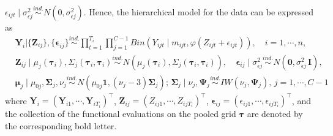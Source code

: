 $\epsilon_{ijt} \mid \sigma^2_{\epsilon j} \stackrel{ind.}{\sim}N(0,\sigma^2_{\epsilon j})$. 
Hence, the hierarchical model for the data can be expressed as 
\begin{equation}
    \begin{split}
        &\mathbf{Y}_i|\{\mathbf{Z}_{ij}\},\{\boldsymbol{\epsilon}_{ij}\}\stackrel{ind.}{\sim} \prod_{t=1}^{T_i}\prod_{j=1}^{C-1}Bin(Y_{ijt}\mid m_{ijt},\varphi(Z_{ijt}+\epsilon_{ijt})),\quad i=1,\cdots,n,\\
        &\mathbf{Z}_{ij}\mid \mu_j(\boldsymbol{\tau}_i),\Sigma_j(\boldsymbol{\tau}_i,\boldsymbol{\tau}_i)\stackrel{ind.}{\sim} N(\mu_j(\boldsymbol{\tau}_i),\Sigma_j(\boldsymbol{\tau}_i,\boldsymbol{\tau}_i)),\quad \boldsymbol{\epsilon}_{ij}\mid \sigma_{\epsilon j}^2\stackrel{ind.}{\sim} 
        N(\mathbf{0},\sigma_{\epsilon j}^2 \, \mathbf{I}),\\
        & \boldsymbol{\mu}_j\mid\mu_{0j},\boldsymbol{\Sigma}_j,\nu_j \stackrel{ind.}{\sim} 
        N(\mu_{0j}\mathbf{1}, (\nu_j - 3) \boldsymbol{\Sigma}_j); \, \boldsymbol{\Sigma}_j\mid\nu_j,\boldsymbol{\Psi}_j\stackrel{ind.}{\sim} 
        IW(\nu_j,\boldsymbol{\Psi}_j), \, j=1,\cdots,C-1
    \end{split}
    \label{eq:fddsmulti}
\end{equation}
where $\mathbf{Y}_{i}=(\mathbf{Y}_{i1},\cdots,\mathbf{Y}_{iT_i})^{\top}$, 
$\mathbf{Z}_{ij}=(Z_{ij1},\cdots,Z_{ijT_i})^{\top}$, 
$\boldsymbol{\epsilon}_{ij}=(\epsilon_{ij1},\cdots,\epsilon_{ijT_i})^{\top}$, 
and the collection of the functional evaluations on the pooled grid $\boldsymbol{\tau}$ 
are denoted by the corresponding bold letter.


